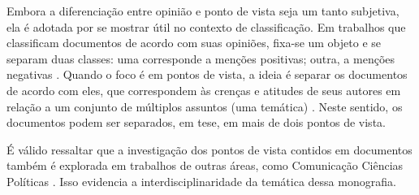 Embora a diferenciação entre opinião e ponto de vista seja um tanto subjetiva, ela é adotada por se mostrar útil no contexto de classificação. Em trabalhos que classificam documentos de acordo com suas opiniões, fixa-se um objeto e se separam duas classes: uma corresponde a menções positivas; outra, a menções negativas \cite{omsa}. Quando o foco é em pontos de vista, a ideia é separar os documentos de acordo com eles, que correspondem às crenças e atitudes de seus autores em relação a um conjunto de múltiplos assuntos (uma temática) \cite{omsa}. Neste sentido, os documentos podem ser separados, em tese, em mais de dois pontos de vista.

É válido ressaltar que a investigação dos pontos de vista contidos em documentos também é explorada em trabalhos de outras áreas, como Comunicação Ciências Políticas \cite{gentzkow} \cite{milyo} \cite{fader}. Isso evidencia a interdisciplinaridade da temática dessa monografia. 

                              


 






